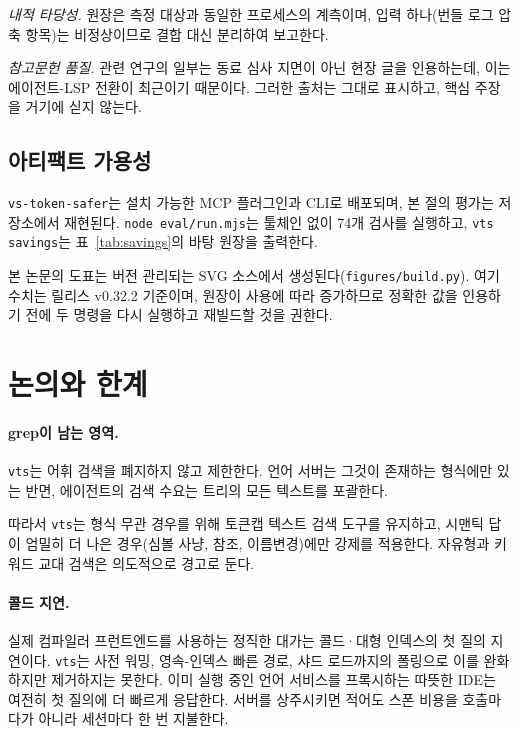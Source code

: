 \documentclass[11pt]{article}
\begin{document}
\emph{내적 타당성.} 원장은 측정 대상과 동일한 프로세스의 계측이며, 입력 하나(번들 로그 압축
항목)는 비정상이므로 결합 대신 분리하여 보고한다.

\emph{참고문헌 품질.} 관련 연구의 일부는 동료 심사 지면이 아닌 현장 글을 인용하는데, 이는
에이전트-LSP 전환이 최근이기 때문이다. 그러한 출처는 그대로 표시하고, 핵심 주장을 거기에 싣지
않는다.

\subsection{아티팩트 가용성}
\texttt{vs-token-safer}는 설치 가능한 MCP 플러그인과 CLI로 배포되며, 본 절의 평가는
저장소에서 재현된다. \texttt{node eval/run.mjs}는 툴체인 없이 74개 검사를 실행하고,
\texttt{vts savings}는 표~\ref{tab:savings}의 바탕 원장을 출력한다.

본 논문의 도표는 버전 관리되는 SVG 소스에서 생성된다(\texttt{figures/build.py}). 여기 수치는
릴리스 v0.32.2 기준이며, 원장이 사용에 따라 증가하므로 정확한 값을 인용하기 전에 두 명령을 다시
실행하고 재빌드할 것을 권한다.

\section{논의와 한계}
\label{sec:discuss}

\paragraph{grep이 남는 영역.}
\texttt{vts}는 어휘 검색을 폐지하지 않고 제한한다. 언어 서버는 그것이 존재하는 형식에만 있는
반면, 에이전트의 검색 수요는 트리의 모든 텍스트를 포괄한다.

따라서 \texttt{vts}는 형식 무관 경우를 위해 토큰캡 텍스트 검색 도구를 유지하고, 시맨틱 답이
엄밀히 더 나은 경우(심볼 사냥, 참조, 이름변경)에만 강제를 적용한다. 자유형과 키워드 교대 검색은
의도적으로 경고로 둔다.

\paragraph{콜드 지연.}
실제 컴파일러 프런트엔드를 사용하는 정직한 대가는 콜드·대형 인덱스의 첫 질의 지연이다.
\texttt{vts}는 사전 워밍, 영속-인덱스 빠른 경로, 샤드 로드까지의 폴링으로 이를 완화하지만
제거하지는 못한다. 이미 실행 중인 언어 서비스를 프록시하는 따뜻한 IDE는 여전히 첫 질의에 더
빠르게 응답한다. 서버를 상주시키면 적어도 스폰 비용을 호출마다가 아니라 세션마다 한 번 지불한다.
\end{document}
